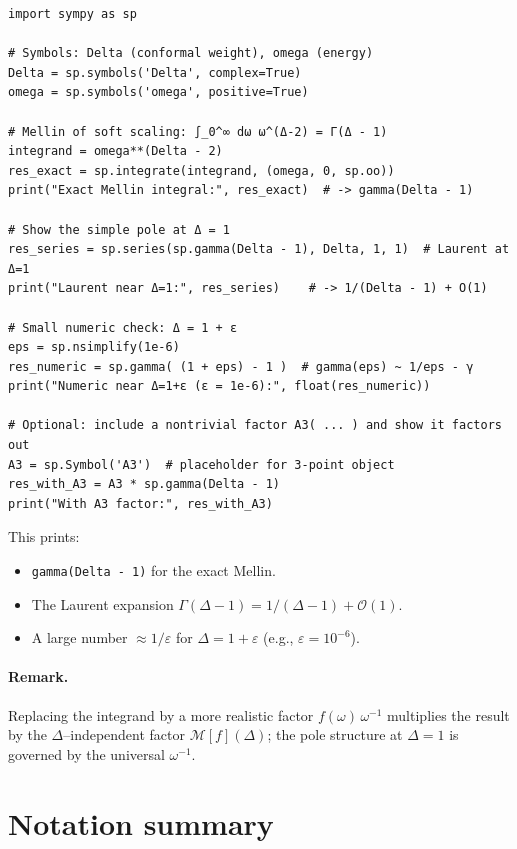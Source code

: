 \documentclass[11pt]{article}
\begin{document}
\begin{verbatim}
import sympy as sp

# Symbols: Delta (conformal weight), omega (energy)
Delta = sp.symbols('Delta', complex=True)
omega = sp.symbols('omega', positive=True)

# Mellin of soft scaling: ∫_0^∞ dω ω^(Δ-2) = Γ(Δ - 1)
integrand = omega**(Delta - 2)
res_exact = sp.integrate(integrand, (omega, 0, sp.oo))
print("Exact Mellin integral:", res_exact)  # -> gamma(Delta - 1)

# Show the simple pole at Δ = 1
res_series = sp.series(sp.gamma(Delta - 1), Delta, 1, 1)  # Laurent at Δ=1
print("Laurent near Δ=1:", res_series)    # -> 1/(Delta - 1) + O(1)

# Small numeric check: Δ = 1 + ε
eps = sp.nsimplify(1e-6)
res_numeric = sp.gamma( (1 + eps) - 1 )  # gamma(eps) ~ 1/eps - γ
print("Numeric near Δ=1+ε (ε = 1e-6):", float(res_numeric))

# Optional: include a nontrivial factor A3( ... ) and show it factors out
A3 = sp.Symbol('A3')  # placeholder for 3-point object
res_with_A3 = A3 * sp.gamma(Delta - 1)
print("With A3 factor:", res_with_A3)
\end{verbatim}

This prints:
\begin{itemize}
  \item \texttt{gamma(Delta - 1)} for the exact Mellin.
  \item The Laurent expansion $\Gamma(\Delta-1) = 1/(\Delta-1) + \mathcal{O}(1)$.
  \item A large number $\approx 1/\varepsilon$ for $\Delta=1+\varepsilon$ (e.g., $\varepsilon=10^{-6}$).
\end{itemize}

\paragraph{Remark.} Replacing the integrand by a more realistic factor $f(\omega)\,\omega^{-1}$ multiplies the result by the $\Delta$–independent factor $\mathcal{M}[f](\Delta)$; the pole structure at $\Delta=1$ is governed by the universal $\omega^{-1}$.\section{Notation summary}
\label{app:notation}
\end{document}

